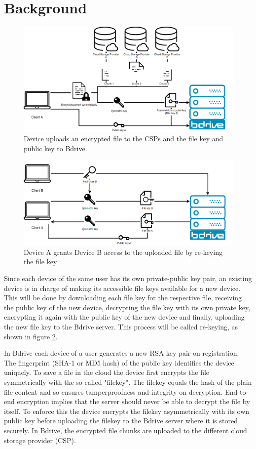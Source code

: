 \section{Background}
\begin{figure}[!ht]
\centering
    \includegraphics[width=0.8\linewidth]{img/bdrive1.png}\par 
    \caption{Device uploads an encrypted file to the \ac{CSP}s and the file key and public key to Bdrive.}
    \label{fig:filekey}
\end{figure}
\begin{figure}[!ht]
\centering
    \includegraphics[width=0.8\linewidth]{img/bdrive2.png}\par
    \caption{Device A grants Device B access to the uploaded file by re-keying the file key}
    \label{fig:rekey}
\end{figure}
Since each device of the same user has its own private-public key pair, an existing device is in charge of making its accessible file keys available for a new device. This will be done by downloading each file key for the respective file, receiving the public key of the new device, decrypting the file key with its own private key, encrypting it again with the public key of the new device and finally, uploading the new file key to the Bdrive server. This process will be called re-keying, as shown in figure \ref{fig:rekey}. 

In Bdrive each device of a user generates a new \ac{RSA} key pair on registration. The fingerprint (SHA-1 or MD5 hash) of the public key identifies the device uniquely. To save a file in the cloud the device first encrypts the file symmetrically with the so called "filekey". The filekey equals the hash of the plain file content and so ensures tamperproofness and integrity on decryption. End-to-end encryption implies that the server should never be able to decrypt the file by itself. To enforce this the device encrypts the filekey asymmetrically with its own public key before uploading the filekey to the Bdrive server where it is stored securely. In Bdrive, the encrypted file chunks are uploaded to the different cloud storage provider (\ac{CSP}). 

